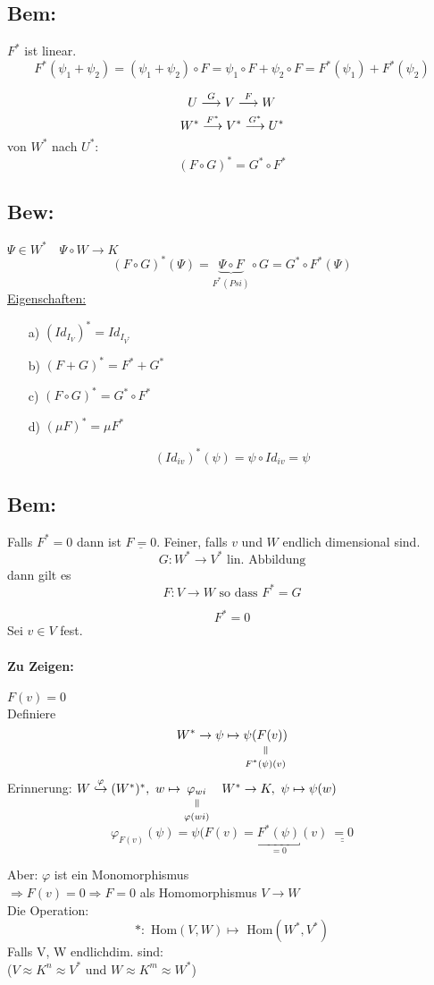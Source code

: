 \documentclass[titlepage,12pt,a4paper,ngerman]{report}
\newcommand{\verteq}{\rotatebox{90}{$\,=$}}
\newcommand{\equalto}[2]{\underset{\scriptstyle\overset{\mkern4mu\verteq}{#2}}{#1}}
\newcommand{\tx}[1]{\textrm{#1}}
\newcommand{\ub}[1]{\underbrace{#1}}
\begin{document}
\subsection*{Bem:}
$F^*$ ist linear. 
$$F^* (\psi_1 + \psi_2) = (\psi_1 + \psi_2) \circ F = \psi_1 \circ F + \psi_2 \circ F = F^* (\psi_1) + F^* (\psi_2)$$

$$ U \buildrel G \over \longrightarrow V \buildrel F \over \longrightarrow W$$
$$ W^* \buildrel F^* \over \longrightarrow V^* \buildrel G^* \over \longrightarrow U^*$$
von $ W^* $ nach $ U^* $:
$$(F\circ G)^* = G^* \circ F^*$$
\subsection{Bew:} $ \Psi \in W^* \quad \Psi \circ W \to K $ 
$$(F \circ G)^*(\Psi) = \ub{\Psi\circ F}_{F^*(Psi)} \circ G = G^* \circ F^*(\Psi)$$
\underline{Eigenschaften:}
\begin{itemize}
	\item[a)] $ (Id_{I_{V}})^* = Id_{I_{V^*}} $
	\item[b)] $ (F+G)^* = F^* + G^* $
	\item[c)] $ (F\circ G)^* = G^* \circ F^* $
	\item[d)] $ (\mu F)^* = \mu F^* $
\end{itemize}

$$(Id_{iv})^* (\psi) = \psi \circ Id_{iv} = \psi$$
\subsection*{Bem:} Falls $F^* =0$ dann ist $\underline{F = 0}$. Feiner, falls $v$ und $W$ endlich dimensional sind.
$$G: W^* \to V^* \tx{ lin. Abbildung}$$ dann gilt es $$F: V \to W \tx{ so dass } F^* = G$$

\bew $$F^* = 0$$ Sei $v \in V$ fest. \\
\paragraph{Zu Zeigen:} 
$F (v) = 0$ \\[10pt]
Definiere $$W^* \to \psi \mapsto \equalto{\psi (F(v))}{F^* (\psi)(v)}$$ 
Erinnerung: $W \buildrel \varphi \over \hookrightarrow (W^*)^* , \ w \mapsto \equalto{\varphi_{wi}}{\varphi(wi)} \quad W^* \to K, \ \psi \mapsto \psi(w)$
$$\varphi_{F(v)} (\psi) = \psi (F(v) = \underbracket{F^* (\psi)}_{=0} (v) \ \underline{\underline{= 0}}$$


Aber: $ \varphi $ ist ein Monomorphismus\\
$ \Rightarrow F(v) = 0 \Rightarrow  F = 0 $ als Homomorphismus $ V\to W $\\
Die Operation:
$$ * : \tx{ Hom}(V,W) \mapsto \tx{ Hom}(W^*,V^*)$$
Falls V, W endlichdim. sind:\\
($ V \approx K^n \approx V^*  $ und $ W \approx K^m \approx W^* $)\\
\end{document}
